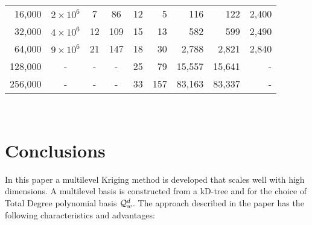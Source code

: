 \documentclass[11pt,final]{amsart}       %
\begin{document}
\begin{table*}[htbp]
\begin{center}
\begin{tabular} { r c c c c r r r r}
  \hline
 16,000  & $2  \times 10^{6}$  &   7  & 86  & 12 &   5  &         116   &    122 & 2,400   \\
 32,000  &  $4   \times 10^{6}$ &  12 & 109 & 15 &  13  &         582   &    599 & 2,490 \\
 64,000  &  $9  \times 10^{6}$ &   21 & 147  & 18 &  30  &       2,788  &  2,821 & 2,840 \\
 128,000  &  -                  &  - & -  & 25 &  79  &      15,557   & 15,641 &  - \\
 256,000  &  -                  &  - & -  & 33 & 157  &      83,163   & 83,337 &  - \\
\end{tabular}\\
\end{center}
\label{numericalresults:table4}
\end{table*}

\section{Conclusions}

In this paper a multilevel Kriging method is developed that scales
well with high dimensions. A multilevel basis is constructed from a
kD-tree and for the choice of Total Degree polynomial basis
${\mathcal Q}^d_w$.  The approach described in the paper has the following
characteristics and advantages:
\end{document}

